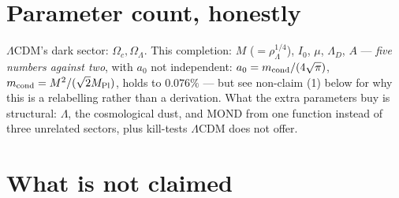 \documentclass[aps,prd,twocolumn,10pt,nofootinbib,superscriptaddress]{revtex4-2}
\begin{document}
\section{Parameter count, honestly}
\label{sec:parameters}

$\Lambda$CDM's dark sector: $\Omega_c,\Omega_\Lambda$. This completion: $M$ ($=\rho_\Lambda^{1/4}$),
$I_0$, $\mu$, $\Lambda_D$, $A$ --- \emph{five numbers against two}, with $a_0$ not independent:
$a_0=m_{\rm cond}/(4\sqrt\pi)$, $m_{\rm cond}=M^2/(\sqrt2 M_{\rm Pl})$, holds to $0.076\%$ --- but
see non-claim (1) below for why this is a relabelling rather than a derivation. What the extra
parameters buy is structural: $\Lambda$, the cosmological dust, and MOND from one function instead
of three unrelated sectors, plus kill-tests $\Lambda$CDM does not offer.

\section{What is not claimed}
\label{sec:notclaimed}
\end{document}
